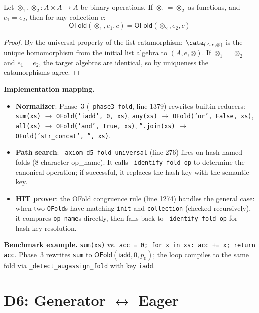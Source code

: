 \begin{theorem}
\label{thm:d5-sound}
Let $\otimes_1, \otimes_2 : A \times A \to A$ be binary operations.
If $\otimes_1 = \otimes_2$ as functions, and $e_1 = e_2$, then
for any collection $c$:
\[
  \mathsf{OFold}(\otimes_1, e_1, c) = \mathsf{OFold}(\otimes_2, e_2, c)
\]
\end{theorem}

\begin{proof}
By the universal property of the list catamorphism:
$\cata_{(A, e, \otimes)}$ is the unique homomorphism from the
initial list algebra to $(A, e, \otimes)$.  If $\otimes_1 = \otimes_2$
and $e_1 = e_2$, the target algebras are identical, so by uniqueness
the catamorphisms agree.
\end{proof}

\textbf{Implementation mapping.}
\begin{itemize}
  \item \textbf{Normalizer}: Phase~3 (\texttt{\_phase3\_fold},
    line 1379) rewrites builtin reducers:
    \texttt{sum(xs)} $\to$ \texttt{OFold('iadd', 0, xs)},
    \texttt{any(xs)} $\to$ \texttt{OFold('or', False, xs)},
    \texttt{all(xs)} $\to$ \texttt{OFold('and', True, xs)},
    \texttt{''.join(xs)} $\to$ \texttt{OFold('str\_concat', '', xs)}.
  \item \textbf{Path search}: \texttt{\_axiom\_d5\_fold\_universal}
    (line 276) fires on hash-named folds (8-character op\_name).
    It calls \texttt{\_identify\_fold\_op} to determine the canonical
    operation; if successful, it replaces the hash key with the
    semantic key.
  \item \textbf{HIT prover}: the OFold congruence rule (line 1274)
    handles the general case: when two \texttt{OFold}s have matching
    \texttt{init} and \texttt{collection} (checked recursively),
    it compares \texttt{op\_name}s directly, then falls back to
    \texttt{\_identify\_fold\_op} for hash-key resolution.
\end{itemize}

\textbf{Benchmark example.}
\texttt{sum(xs)} vs.\ \texttt{acc = 0; for x in xs: acc += x;
return acc}.  Phase~3 rewrites \texttt{sum} to
$\mathsf{OFold}(\mathsf{iadd}, 0, p_0)$; the loop compiles to
the same fold via \texttt{\_detect\_augassign\_fold} with key
\texttt{iadd}.


\section{D6: Generator $\leftrightarrow$ Eager}
\label{sec:d6}


